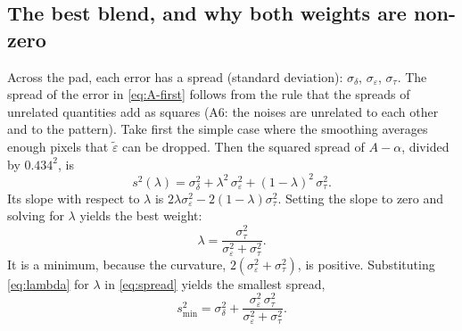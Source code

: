 \documentclass[11pt,letter]{article}
\begin{document}
\subsection{The best blend, and why both weights are non-zero}
\label{sec:lambda}

Across the pad, each error has a spread (standard deviation):
$\sigma_\delta$, $\sigma_\varepsilon$, $\sigma_\tau$.  The spread of the
error in \eqref{eq:A-first} follows from the rule that the spreads of
unrelated quantities add as squares (A6: the noises are unrelated to each
other and to the pattern).  Take first the simple case where the smoothing
averages enough pixels that $\widetilde\varepsilon$ can be dropped.  Then
the squared spread of $A - \alpha$, divided by $0.434^2$, is
\begin{equation}
  s^2(\lambda) = \sigma_\delta^2 + \lambda^2\,\sigma_\varepsilon^2
    + (1 - \lambda)^2\,\sigma_\tau^2 .
  \label{eq:spread}
\end{equation}
Its slope with respect to $\lambda$ is
$2\lambda\sigma_\varepsilon^2 - 2(1 - \lambda)\sigma_\tau^2$.  Setting the
slope to zero and solving for $\lambda$ yields the best weight:
\begin{equation}
  \lambda = \frac{\sigma_\tau^2}{\sigma_\varepsilon^2 + \sigma_\tau^2} .
  \label{eq:lambda}
\end{equation}
It is a minimum, because the curvature,
$2(\sigma_\varepsilon^2 + \sigma_\tau^2)$, is positive.  Substituting
\eqref{eq:lambda} for $\lambda$ in \eqref{eq:spread} yields the smallest
spread,
\begin{equation}
  s^2_{\min} = \sigma_\delta^2
    + \frac{\sigma_\varepsilon^2\, \sigma_\tau^2}
           {\sigma_\varepsilon^2 + \sigma_\tau^2} .
  \label{eq:spread-min}
\end{equation}
\end{document}
